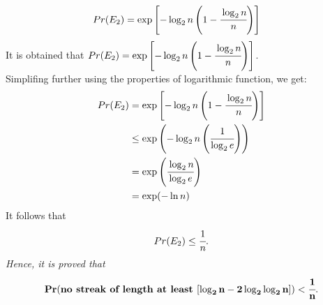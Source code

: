 \documentclass{article}
\begin{document}
\begin{enumerate}
\begin{enumerate}
\begin{align*}
                Pr(E_2) &= \exp\left[-\log_2 n \left(1 - \cfrac{\log_2 n}{n}\right)\right]
            \end{align*}            
            It is obtained that \(Pr(E_2) = \exp\left[-\log_2 n \left(1 - \cfrac{\log_2 n}{n}\right)\right]\).\\
            Simplifing further using the properties of logarithmic function, we get:
            \begin{align*}
                Pr(E_2) &= \exp\left[-\log_2 n \left(1 - \cfrac{\log_2 n}{n}\right)\right]\\
                &\leq \exp\left(-\log_2 n \left(\cfrac{1}{\log_2 e}\right)\right)\\
                &= \exp\left(\cfrac{\log_2 n}{\log_2 e}\right)\\
                &= \exp(-\ln n)
            \end{align*}
            It follows that
            \[
                Pr(E_2) \leq \cfrac{1}{n}.
            \]
            \textit{Hence, it is proved that}
            \[
                \mathbf{Pr(\textbf{no streak of length at least }[\log_2 n - 2\log_2 \log_2 n]) < \cfrac{1}{n}}.
            \]
    \end{enumerate}


\end{enumerate}
\end{document}
